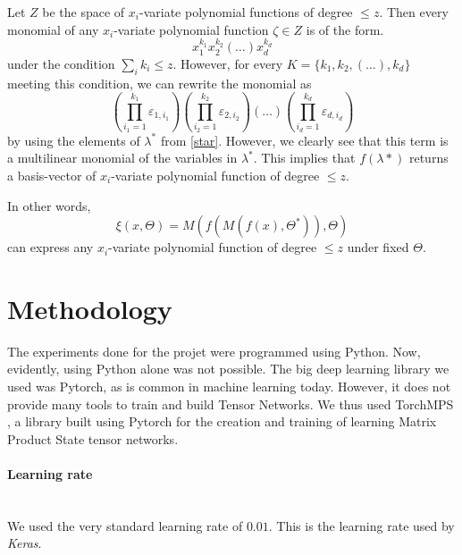 \documentclass[11pt]{article}
\theoremstyle{definition}
\theoremstyle{definition}
\begin{document}
Let $Z$ be the space of $x_i$-variate polynomial functions 
of degree $\leq z$. Then every monomial of any $x_i$-variate polynomial function
$\zeta \in Z$ is of the form.
\begin{equation}
    x_{1}^{k_1}x_{2}^{k_2}(\dots)x_{d}^{k_d}
\end{equation}
under the condition $\sum_{i}k_i \leq z$. 
However, for every $K = \{k_1, k_2, (\dots), k_d\}$ meeting this condition,
we can rewrite the monomial as
\begin{equation}
    \left( \prod_{i_1=1}^{k_1}\varepsilon_{1, i_1} \right)
    \left( \prod_{i_2=1}^{k_2}\varepsilon_{2, i_2} \right)
    \left( \dots \right)
    \left( \prod_{i_d=1}^{k_d}\varepsilon_{d, i_d} \right)
\end{equation}
by using the elements of $\lambda^*$ from \eqref{star}.
However, we clearly see that this term is a multilinear 
monomial of the variables in $\lambda^*$. This implies that
$f(\lambda*)$ returns a basis-vector of $x_i$-variate polynomial 
function of degree $\leq z$.

In other words, 
\begin{equation}
    \xi \left( x, \Theta \right) =
        M
        \left(
            f
            \left(
                M
                \left(
                    f
                    \left(
                        x 
                    \right),
                    \Theta^*
                \right)
            \right),
            \Theta
        \right)
\end{equation}
can express any $x_i$-variate polynomial function of degree $\leq z$ under
fixed $\Theta$.



\section{Methodology}
The experiments done for the projet were programmed using Python. 
Now, evidently, using Python alone was not possible. The big 
deep learning library we used was Pytorch, as is common in machine learning today.
However, it does not provide many tools to train and build Tensor Networks. 
We thus used TorchMPS \cite{torchmps}, a library built using Pytorch for the creation 
and training of learning Matrix Product State tensor networks.

\paragraph{Learning rate} ${}$ \\
We used the very standard learning rate of $0.01$. This is the learning rate
used by {\it Keras}.
\end{document}
